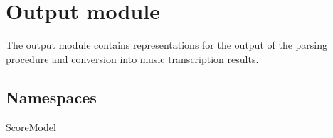 \hypertarget{group__output}{}\section{Output module}
\label{group__output}


The {\ttfamily output} module contains representations for the output of the parsing procedure and conversion into music transcription results.  


\subsection*{Namespaces}
\begin{DoxyCompactItemize}
\item 
 \mbox{\hyperlink{namespaceScoreModel}{Score\+Model}}
\end{DoxyCompactItemize}
